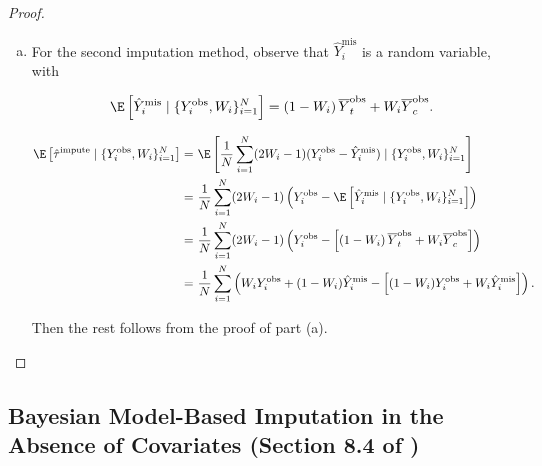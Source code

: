 \begin{proof}
\begin{enumerate}[(a)]
\item For the second imputation method, observe that \( \hat{Y}_i^{\text{mis}}\) is a random variable, with 

\[
\E \left[ \hat{Y}_i^{\text{mis}}  \mid \{Y_i^{\text{obs}}, W_i\}_{i=1}^N \right]  =  \left(1-W_i \right) \overline{Y}_t^{\text{obs}}  + W_i \overline{Y}_c^{\text{obs}} .
\]

\begin{align*}
\E \left[ \hat{\tau}^{\text{impute}}  \mid \{Y_i^{\text{obs}}, W_i\}_{i=1}^N \right] = ~ &  \E \left[  \frac{1}{N} \sum_{i=1}^N (2W_i - 1)(Y_i^{\text{obs}} - \hat{Y}_i^{\text{mis}})  \mid \{Y_i^{\text{obs}}, W_i\}_{i=1}^N \right]
\\ = ~ &  \frac{1}{N} \sum_{i=1}^N (2W_i - 1) \left(Y_i^{\text{obs}} -    \E \left[ \hat{Y}_i^{\text{mis}}  \mid \{Y_i^{\text{obs}}, W_i\}_{i=1}^N \right] \right) 
\\ = ~ &  \frac{1}{N} \sum_{i=1}^N (2W_i - 1) \left(Y_i^{\text{obs}} -    \left[ \left(1-W_i \right) \overline{Y}_t^{\text{obs}}  + W_i \overline{Y}_c^{\text{obs}} \right] \right) 
\\ = ~ &  \frac{1}{N} \sum_{i=1}^N \left( W_i Y_i^{\text{obs}} + (1 - W_i) \hat{Y}_i^{\text{mis}}  - \left[ (1 - W_i) Y_i^{\text{obs}} + W_i \hat{Y}_i^{\text{mis}} \right] \right).
\end{align*}

Then the rest follows from the proof of part (a).

\end{enumerate}

\end{proof}


\subsection{Bayesian Model-Based Imputation in the Absence of Covariates (Section 8.4 of \citet{imbens_rubin_2015})}

%
%
%